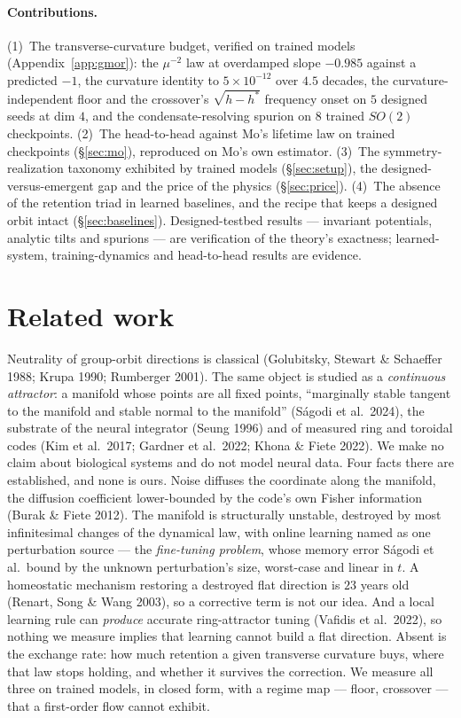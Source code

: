 \documentclass{article}
\begin{document}
\paragraph{Contributions.} (1)~The transverse-curvature budget, verified on trained models (Appendix~\ref{app:gmor}): the $\mu^{-2}$ law at overdamped slope $-0.985$ against a predicted $-1$, the curvature identity to $5\!\times\!10^{-12}$ over $4.5$ decades, the curvature-independent floor and the crossover's $\sqrt{h-h^*}$ frequency onset on $5$ designed seeds at dim $4$, and the condensate-resolving spurion on $8$ trained $SO(2)$ checkpoints. (2)~The head-to-head against Mo's lifetime law on trained checkpoints (\S\ref{sec:mo}), reproduced on Mo's own estimator. (3)~The symmetry-realization taxonomy exhibited by trained models (\S\ref{sec:setup}), the designed-versus-emergent gap and the price of the physics (\S\ref{sec:price}). (4)~The absence of the retention triad in learned baselines, and the recipe that keeps a designed orbit intact (\S\ref{sec:baselines}). Designed-testbed results --- invariant potentials, analytic tilts and spurions --- are verification of the theory's exactness; learned-system, training-dynamics and head-to-head results are evidence.

\section{Related work}\label{sec:related}

Neutrality of group-orbit directions is classical (Golubitsky, Stewart \& Schaeffer 1988; Krupa 1990; Rumberger 2001). The same object is studied as a \emph{continuous attractor}: a manifold whose points are all fixed points, ``marginally stable tangent to the manifold and stable normal to the manifold'' (S\'agodi et al.\ 2024), the substrate of the neural integrator (Seung 1996) and of measured ring and toroidal codes (Kim et al.\ 2017; Gardner et al.\ 2022; Khona \& Fiete 2022). We make no claim about biological systems and do not model neural data. Four facts there are established, and none is ours. Noise diffuses the coordinate along the manifold, the diffusion coefficient lower-bounded by the code's own Fisher information (Burak \& Fiete 2012). The manifold is structurally unstable, destroyed by most infinitesimal changes of the dynamical law, with online learning named as one perturbation source --- the \emph{fine-tuning problem}, whose memory error S\'agodi et al.\ bound by the unknown perturbation's size, worst-case and linear in $t$. A homeostatic mechanism restoring a destroyed flat direction is $23$ years old (Renart, Song \& Wang 2003), so a corrective term is not our idea. And a local learning rule can \emph{produce} accurate ring-attractor tuning (Vafidis et al.\ 2022), so nothing we measure implies that learning cannot build a flat direction. Absent is the exchange rate: how much retention a given transverse curvature buys, where that law stops holding, and whether it survives the correction. We measure all three on trained models, in closed form, with a regime map --- floor, crossover --- that a first-order flow cannot exhibit.
\end{document}
